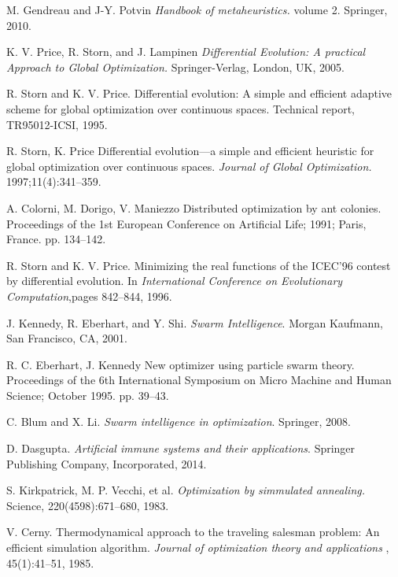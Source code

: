 \begin{thebibliography}{9}
    M. Gendreau and J-Y. Potvin
    \textit{Handbook of metaheuristics.}
    volume 2. Springer, 2010.

    K. V. Price, R. Storn, and J. Lampinen
    \textit{Differential Evolution: A practical Approach to Global Optimization.}
    Springer-Verlag, London, UK, 2005.

    R. Storn and K. V. Price. 
    Differential evolution: A simple and efficient adaptive scheme for global optimization over continuous spaces. 
     Technical report, TR95012-ICSI, 1995.

    R. Storn, K. Price Differential evolution—a simple and efficient heuristic for global optimization over continuous spaces. 
    \textit{Journal of Global Optimization.}
    1997;11(4):341–359. 
    
    A. Colorni, M. Dorigo, V. Maniezzo Distributed optimization by ant colonies. Proceedings of the 1st European Conference on Artificial Life; 1991; Paris, France. pp. 134–142.
    
    R. Storn and K. V. Price. 
    Minimizing the real functions of the ICEC’96 contest by differential evolution. 
    In \textit{International Conference on Evolutionary Computation},pages 842–844, 1996.

    J. Kennedy, R. Eberhart, and Y. Shi.
    \textit{Swarm Intelligence}. 
    Morgan Kaufmann, San Francisco, CA, 2001.
    
    R. C. Eberhart, J. Kennedy New optimizer using particle swarm theory. Proceedings of the 6th International Symposium on Micro Machine and Human Science; October 1995. pp. 39–43.
    
    C. Blum and X. Li.
    \textit{Swarm intelligence in optimization}. 
    Springer, 2008.

    D. Dasgupta.
    \textit{Artificial immune systems and their applications}. 
    Springer Publishing Company, Incorporated, 2014.  
    
    
    S. Kirkpatrick, M. P. Vecchi, et al. 
    \textit{Optimization by simmulated annealing.}
    Science, 220(4598):671–680, 1983.  

    V. Cerny. Thermodynamical approach to the traveling salesman problem: An 
    efficient simulation algorithm. 
    \textit{Journal of optimization theory and applications}
    , 45(1):41–51, 1985.  
    

\end{thebibliography}
